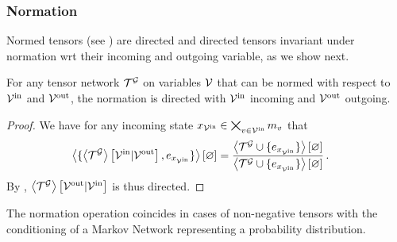 \subsubsection{Normation}


Normed tensors (see ) are directed and directed tensors invariant under normation wrt their incoming and outgoing variable, as we show next.

\begin{theorem}\label{the:normationDirected}
	For any tensor network $\mathcal{T}^{\mathcal{G}}$ on variables $\mathcal{V}$ that can be normed with respect to $\mathcal{V}^{\mathrm{in}}$ and $\mathcal{V}^{\mathrm{out}}$, the normation is directed with $\mathcal{V}^{\mathrm{in}}$ incoming and $\mathcal{V}^{\mathrm{out}}$ outgoing.
\end{theorem}
\begin{proof}
	We have for any incoming state ${x_{\mathcal{V}^{\mathrm{in}}}\in\bigtimes_{v\in\mathcal{V}^{\mathrm{in}}}m_{v}}$ that
	\begin{align*}
		\left\langle \{\left\langle \mathcal{T}^{\mathcal{G}}\right\rangle \left[ \mathcal{V}^{\mathrm{in}} | \mathcal{V}^{\mathrm{out}} \right], e_{x_{\mathcal{V}^{\mathrm{in}}}} \}\right\rangle \left[ \varnothing \right] 
		& =  \frac{
		\left\langle \mathcal{T}^{\mathcal{G}}\cup\{e_{x_{\mathcal{V}^{\mathrm{in}}}}\}\right\rangle \left[ \varnothing \right]
		}{
		\left\langle \mathcal{T}^{\mathcal{G}}\cup\{e_{x_{\mathcal{V}^{\mathrm{in}}}}\}\right\rangle \left[ \varnothing \right]
		} \, .
	\end{align*}
	By , $\left\langle \mathcal{T}^{\mathcal{G}}\right\rangle \left[ \mathcal{V}^{\mathrm{out}} | \mathcal{V}^{\mathrm{in}} \right]$ is thus directed.
%
\end{proof}


The normation operation coincides in cases of non-negative tensors with the conditioning of a Markov Network representing a probability distribution.


